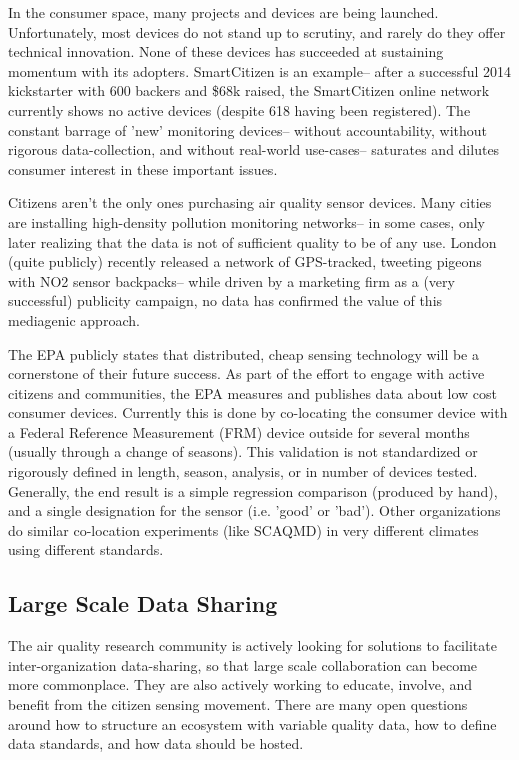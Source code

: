 In the consumer space, many projects and devices are being launched.  Unfortunately, most devices do not stand up to scrutiny, and rarely do they offer technical innovation.  None of these devices has succeeded at sustaining momentum with its adopters.  SmartCitizen is an example-- after a successful 2014 kickstarter with 600 backers and \$68k raised, the SmartCitizen online network currently shows no active devices (despite 618 having been registered). \cite{sck}  The constant barrage of 'new' monitoring devices-- without accountability, without rigorous data-collection, and without real-world use-cases-- saturates and dilutes consumer interest in these important issues.   

Citizens aren't the only ones purchasing air quality sensor devices.  Many cities are installing high-density pollution monitoring networks-- in some cases, only later realizing that the data is not of sufficient quality to be of any use.  London (quite publicly) recently released a network of GPS-tracked, tweeting pigeons with NO2 sensor backpacks-- while driven by a marketing firm as a (very successful) publicity campaign, no data has confirmed the value of this mediagenic approach. \cite{london2016}

The EPA publicly states that distributed, cheap sensing technology will be a cornerstone of their future success. \cite{khan2015}  As part of the effort to engage with active citizens and communities, the EPA measures and publishes data about low cost consumer devices. \cite{williams2014}  Currently this is done by co-locating the consumer device with a Federal Reference Measurement (FRM) device outside for several months (usually through a change of seasons).  This validation is not standardized or rigorously defined in length, season, analysis, or in number of devices tested.  Generally, the end result is a simple regression comparison (produced by hand), and a single designation for the sensor (i.e. 'good' or 'bad').  Other organizations do similar co-location experiments (like SCAQMD) in very different climates using different standards. \cite{scaqmd}

\subsection{Large Scale Data Sharing}

The air quality research community is actively looking for solutions to facilitate inter-organization data-sharing, so that large scale collaboration can become more commonplace.  They are also actively working to educate, involve, and benefit from the citizen sensing movement.  There are many open questions around how to structure an ecosystem with variable quality data, how to define data standards, and how data should be hosted. 
 
